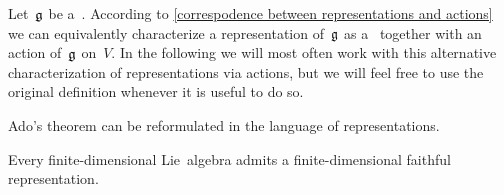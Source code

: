 \begin{fluff}
  Let~$\mathfrak{g}$ be a~\liealgebra{$\kf$}.
  According to \cref{correspodence between representations and actions} we can equivalently characterize a representation of~$\mathfrak{g}$ as a~\vectorspace{$\kf$} together with an action of~$\mathfrak{g}$ on~$V$.
  In the following we will most often work with this alternative characterization of representations via actions, but we will feel free to use the original definition whenever it is useful to do so.
\end{fluff}




\begin{fluff}
  Ado’s theorem can be reformulated in the language of representations.
\end{fluff}


\begin{theorem}
  Every finite-dimensional Lie~algebra admits a finite-dimensional faithful representation.
\end{theorem}


